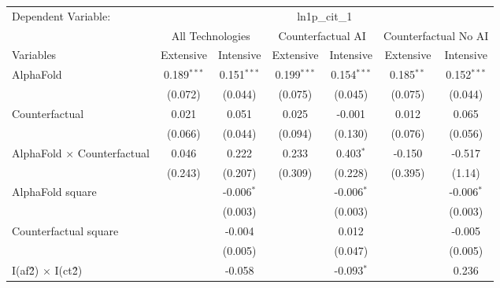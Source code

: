 \begingroup
\centering
\begin{tabular}{lcccccc}
   \tabularnewline \midrule \midrule
   Dependent Variable: & \multicolumn{6}{c}{ln1p\_cit\_1}\\
 & \multicolumn{2}{c}{All Technologies} & \multicolumn{2}{c}{Counterfactual AI} & \multicolumn{2}{c}{Counterfactual No AI} \\
\cmidrule(lr){1-1}\cmidrule(lr){2-3} \cmidrule(lr){4-5} \cmidrule(lr){6-7}
Variables & \multicolumn{1}{c}{Extensive} & \multicolumn{1}{c}{Intensive} & \multicolumn{1}{c}{Extensive} & \multicolumn{1}{c}{Intensive} & \multicolumn{1}{c}{Extensive} & \multicolumn{1}{c}{Intensive} \\
\cmidrule(lr){1-1}\cmidrule(lr){2-2} \cmidrule(lr){3-3} \cmidrule(lr){4-4} \cmidrule(lr){5-5} \cmidrule(lr){6-6} \cmidrule(lr){7-7}
   AlphaFold                          & 0.189$^{***}$ & 0.151$^{***}$ & 0.199$^{***}$ & 0.154$^{***}$ & 0.185$^{**}$ & 0.152$^{***}$\\   
                                      & (0.072)       & (0.044)       & (0.075)       & (0.045)       & (0.075)      & (0.044)\\   
   Counterfactual                     & 0.021         & 0.051         & 0.025         & -0.001        & 0.012        & 0.065\\   
                                      & (0.066)       & (0.044)       & (0.094)       & (0.130)       & (0.076)      & (0.056)\\   
   AlphaFold $\times$ Counterfactual  & 0.046         & 0.222         & 0.233         & 0.403$^{*}$   & -0.150       & -0.517\\   
                                      & (0.243)       & (0.207)       & (0.309)       & (0.228)       & (0.395)      & (1.14)\\   
   AlphaFold square                   &               & -0.006$^{*}$  &               & -0.006$^{*}$  &              & -0.006$^{*}$\\   
                                      &               & (0.003)       &               & (0.003)       &              & (0.003)\\   
   Counterfactual square              &               & -0.004        &               & 0.012         &              & -0.005\\   
                                      &               & (0.005)       &               & (0.047)       &              & (0.005)\\   
   I(af\^2) $\times$ I(ct\^2)         &               & -0.058        &               & -0.093$^{*}$  &              & 0.236\\   

\end{tabular}

